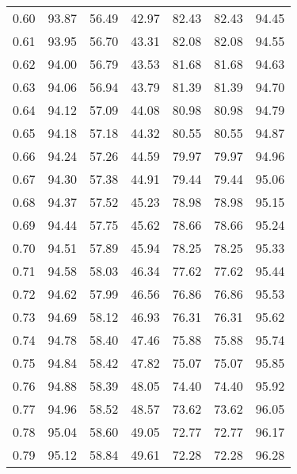 \begin{tabular}{|c|c|c|c|c|c|c|}
      0.60 &     93.87 &     56.49 &      42.97 &   82.43 &      82.43 &         94.45 \\
      0.61 &     93.95 &     56.70 &      43.31 &   82.08 &      82.08 &         94.55 \\
      0.62 &     94.00 &     56.79 &      43.53 &   81.68 &      81.68 &         94.63 \\
      0.63 &     94.06 &     56.94 &      43.79 &   81.39 &      81.39 &         94.70 \\
      0.64 &     94.12 &     57.09 &      44.08 &   80.98 &      80.98 &         94.79 \\
      0.65 &     94.18 &     57.18 &      44.32 &   80.55 &      80.55 &         94.87 \\
      0.66 &     94.24 &     57.26 &      44.59 &   79.97 &      79.97 &         94.96 \\
      0.67 &     94.30 &     57.38 &      44.91 &   79.44 &      79.44 &         95.06 \\
      0.68 &     94.37 &     57.52 &      45.23 &   78.98 &      78.98 &         95.15 \\
      0.69 &     94.44 &     57.75 &      45.62 &   78.66 &      78.66 &         95.24 \\
      0.70 &     94.51 &     57.89 &      45.94 &   78.25 &      78.25 &         95.33 \\
      0.71 &     94.58 &     58.03 &      46.34 &   77.62 &      77.62 &         95.44 \\
      0.72 &     94.62 &     57.99 &      46.56 &   76.86 &      76.86 &         95.53 \\
      0.73 &     94.69 &     58.12 &      46.93 &   76.31 &      76.31 &         95.62 \\
      0.74 &     94.78 &     58.40 &      47.46 &   75.88 &      75.88 &         95.74 \\
      0.75 &     94.84 &     58.42 &      47.82 &   75.07 &      75.07 &         95.85 \\
      0.76 &     94.88 &     58.39 &      48.05 &   74.40 &      74.40 &         95.92 \\
      0.77 &     94.96 &     58.52 &      48.57 &   73.62 &      73.62 &         96.05 \\
      0.78 &     95.04 &     58.60 &      49.05 &   72.77 &      72.77 &         96.17 \\
      0.79 &     95.12 &     58.84 &      49.61 &   72.28 &      72.28 &         96.28 \\

\end{tabular}
